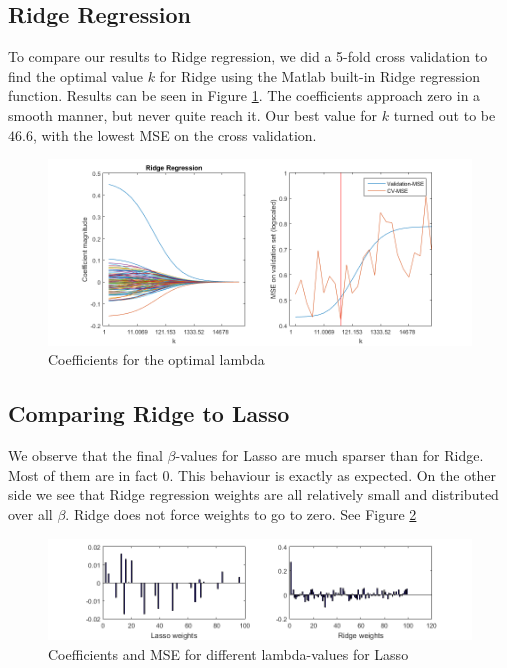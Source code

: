 \documentclass[a4paper, 11pt]{article}
\begin{document}
\subsection*{Ridge Regression}
To compare our results to Ridge regression, we did a 5-fold cross validation to find the optimal value $k$ for Ridge using the Matlab built-in Ridge regression function. Results can be seen in Figure \ref{img:k}. The coefficients approach zero in a smooth manner, but never quite reach it. Our best value for $k$ turned out to be $46.6$, with the lowest MSE on the cross validation. 
\begin{figure}[htbp]
\hspace{-3.5cm}
\includegraphics[scale=0.8]{ridge.png}
\caption{Coefficients for the optimal lambda}
\label{img:k}
\end{figure}

\subsection*{Comparing Ridge to Lasso}

We observe that the final $\beta$-values for Lasso are much sparser than for Ridge. Most of them are in fact 0. This behaviour is exactly as expected. On the other side we see that Ridge regression weights are all relatively small and distributed over all $\beta$. Ridge does not force weights to go to zero. See Figure \ref{img:weights}
\begin{figure}[htbp]
\hspace{-3.5cm}
\includegraphics[scale=0.9]{weights.png}
\caption{Coefficients and MSE for different lambda-values for Lasso}
\label{img:weights}
\end{figure}
\end{document}
